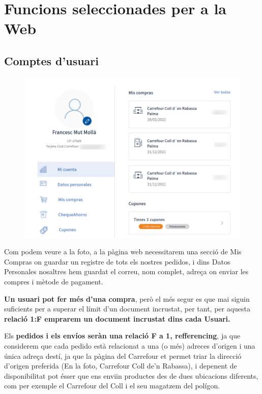 \section{Funcions seleccionades per a la Web}
\subsection{Comptes d'usuari}

\begin{figure}[htpb!]
    \centering
    \includegraphics[width=400pt]{figures/Usuaris.png}
\end{figure}

    Com podem veure a la foto, a la pàgina web necessitarem una secció de Mis Compras on guardar un registre de 
    tots els nostres pedidos, i dins Datos Personales nosaltres hem guardat el correu, nom complet, adreça on 
    enviar les compres i mètode de pagament.
    
    \textbf{Un usuari pot fer més d'una compra}, però el més segur es que mai siguin suficients per a superar el límit 
    d'un document incrustat, per tant, per aquesta \textbf{relació 1:F emprarem un document incrustat dins cada Usuari.}

    Els \textbf{pedidos i els envíos seràn una relació F a 1, refferencing}, ja que considerem que cada pedido està 
    relacionat a una (o més) adreces d'origen i una única adreça destí, ja que la pàgina del Carrefour et permet triar 
    la direcció d'origen preferida (En la foto, Carrefour Coll de'n Rabassa), i depenent de disponibilitat pot ésser 
    que ens enviin productes des de dues ubicacions diferents, com per exemple el Carrefour del Coll i el seu magatzem del polígon.


